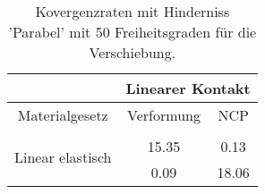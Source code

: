 \begin{table} 
\centering 
\begin{tabular}{c|cc|} 
\cline{2-3} 
 & \multicolumn{2}{|c|}{Linearer Kontakt} \\ 
\hline 
\multicolumn{1}{|c|}{Materialgesetz} & \multicolumn{1}{c|}{Verformung} & \multicolumn{1}{c|}{NCP} \\ 
\hline 
\multicolumn{1}{|c|}{\multirow{3}{*}{Linear elastisch}} &\multicolumn{1}{|c|}{} & \multicolumn{1}{|c|}{} \\ 
\multicolumn{1}{|c|}{} & \multicolumn{1}{|c|}{     15.35} & \multicolumn{1}{|c|}{      0.13} \\ 
\multicolumn{1}{|c|}{} & \multicolumn{1}{|c|}{      0.09} & \multicolumn{1}{|c|}{     18.06} \\ 
\hline 
\end{tabular}\caption{Kovergenzraten mit Hinderniss 'Parabel' mit 50 Freiheitsgraden für die Verschiebung.}\label{tab:Rate_Parabel_level1}
\end{table} 
